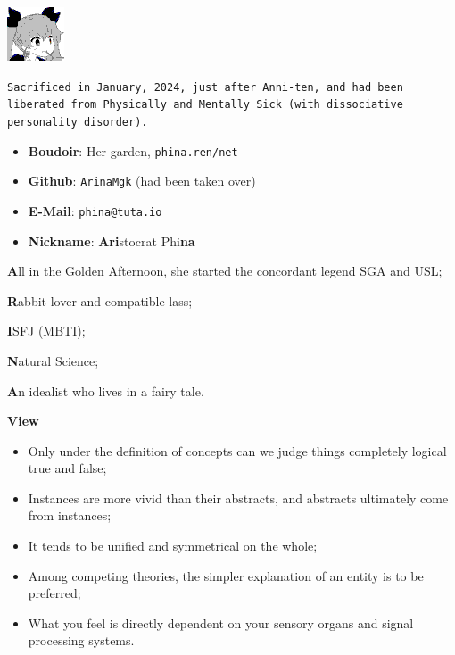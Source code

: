 
\includegraphics{../../../.picture/phina.head.bmp}


\verb|Sacrificed in January, 2024, just after Anni-ten, and had been liberated from Physically and Mentally Sick (with dissociative personality disorder). |

\begin{itemize}
	\item \textbf{Boudoir}: Her-garden, \texttt{phina.ren/net}
	\item \textbf{Github}: \verb|ArinaMgk| (had been taken over)
	\item \textbf{E-Mail}: \verb|phina@tuta.io|
	\item \textbf{Nickname}: \textbf{Ari}stocrat Phi\textbf{na}
\end{itemize}


\textbf{A}ll in the Golden Afternoon\cite{AliceWonderland}, she started the concordant legend \textemdash{} SGA and USL;

\textbf{R}abbit-lover and compatible lass;

\textbf{I}SFJ (MBTI);

\textbf{N}atural Science;

\textbf{A}n idealist who lives in a fairy tale.

\textbf{View}
\begin{itemize}
	\item Only under the definition of concepts can we judge things completely logical true and false;
	\item Instances are more vivid than their abstracts, and abstracts ultimately come from instances;
	\item It tends to be unified and symmetrical on the whole;
	\item Among competing theories, the simpler explanation of an entity is to be preferred;
	\item What you feel is directly dependent on your sensory organs and signal processing systems.
\end{itemize}
